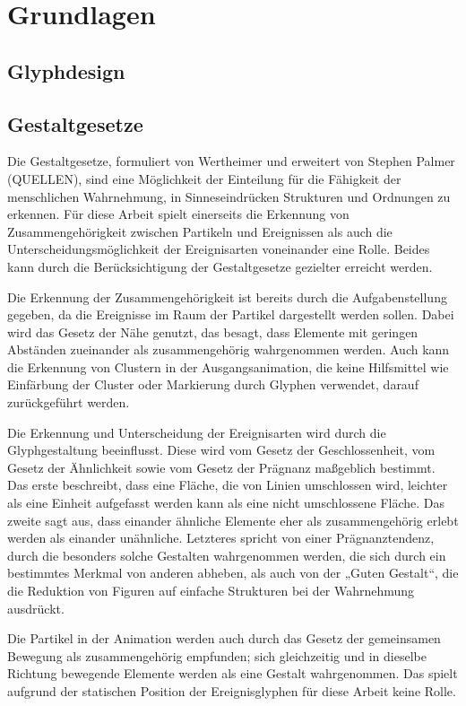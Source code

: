 \section{Grundlagen}

\subsection{Glyphdesign}


\subsection{Gestaltgesetze}\label{sec:gestaltgesetze}
Die Gestaltgesetze, formuliert von Wertheimer und erweitert von Stephen Palmer (QUELLEN), sind eine Möglichkeit der Einteilung für die Fähigkeit der menschlichen Wahrnehmung, in Sinneseindrücken Strukturen und Ordnungen zu erkennen. Für diese Arbeit spielt einerseits die Erkennung von Zusammengehörigkeit zwischen Partikeln und Ereignissen als auch die Unterscheidungsmöglichkeit der Ereignisarten voneinander eine Rolle. Beides kann durch die Berücksichtigung der Gestaltgesetze gezielter erreicht werden.

Die Erkennung der Zusammengehörigkeit ist bereits durch die Aufgabenstellung gegeben, da die Ereignisse im Raum der Partikel dargestellt werden sollen. Dabei wird das Gesetz der Nähe genutzt, das besagt, dass Elemente mit geringen Abständen zueinander als zusammengehörig wahrgenommen werden. Auch kann die Erkennung von Clustern in der Ausgangsanimation, die keine Hilfsmittel wie Einfärbung der Cluster oder Markierung durch Glyphen verwendet, darauf zurückgeführt werden.

Die Erkennung und Unterscheidung der Ereignisarten wird durch die Glyphgestaltung beeinflusst. Diese wird vom Gesetz der Geschlossenheit, vom Gesetz der Ähnlichkeit sowie vom Gesetz der Prägnanz maßgeblich bestimmt. Das erste beschreibt, dass eine Fläche, die von Linien umschlossen wird, leichter als eine Einheit aufgefasst werden kann als eine nicht umschlossene Fläche. Das zweite sagt aus, dass einander ähnliche Elemente eher als zusammengehörig erlebt werden als einander unähnliche. Letzteres spricht von einer Prägnanztendenz, durch die besonders solche Gestalten wahrgenommen werden, die sich durch ein bestimmtes Merkmal von anderen abheben, als auch von der „Guten Gestalt“, die die Reduktion von Figuren auf einfache Strukturen bei der Wahrnehmung ausdrückt.

Die Partikel in der Animation werden auch durch das Gesetz der gemeinsamen Bewegung als zusammengehörig empfunden; sich gleichzeitig und in dieselbe Richtung bewegende Elemente werden als eine Gestalt wahrgenommen. Das spielt aufgrund der statischen Position der Ereignisglyphen für diese Arbeit keine Rolle.

